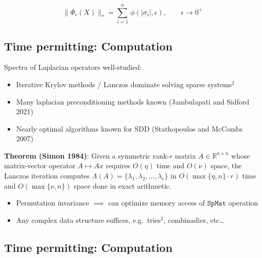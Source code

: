 \documentclass[
  letterpaper,
  DIV=11,
  numbers=noendperiod,
  oneside]{scrartcl}
\providecommand{\tightlist}{%
  \setlength{\itemsep}{0pt}\setlength{\parskip}{0pt}}\usepackage{longtable,booktabs,array}
\begin{document}
\[
\lVert \Phi_\epsilon(X) \rVert_\ast = \sum\limits_{i=1}^{n} \, \phi(\lvert \sigma_i \rvert, \epsilon), \quad \quad \epsilon \to 0^+
\]

\hypertarget{time-permitting-computation}{%
\subsection{Time permitting:
Computation}\label{time-permitting-computation}}

Spectra of Laplacian operators well-studied:

\begin{itemize}
\tightlist
\item
  Iterative Krylov methods / Lanczos dominate solving sparse
  systems\(^2\)
\item
  Many laplacian preconditioning methods known (Jambulapati and Sidford
  2021)
\item
  Nearly optimal algorithms known for SDD (Stathopoulos and McCombs
  2007)
\end{itemize}

\textbf{Theorem (Simon 1984)}: Given a symmetric rank-\(r\) matrix
\(A \in \mathbb{R}^{n \times n}\) whose matrix-vector operator
\(A \mapsto A x\) requires \(O(\eta)\) time and \(O(\nu)\) space, the
Lanczos iteration computes
\(\Lambda(A) = \{ \lambda_1, \lambda_2, \dots, \lambda_r \}\) in
\(O(\max\{\eta, n\}\cdot r)\) time and \(O(\max\{\nu, n\})\) space done
in exact arithmetic.

\begin{itemize}
\tightlist
\item
  Permutation invariance \(\implies\) can optimize memory access of
  \(\mathtt{SpMat}\) operation
\end{itemize}

\begin{itemize}
\tightlist
\item
  Any complex data structure suffices, e.g.~tries\(^2\), combinadics,
  etc\ldots{}
\end{itemize}


\hypertarget{time-permitting-computation-1}{%
\subsection{Time permitting:
Computation}\label{time-permitting-computation-1}}
\end{document}
